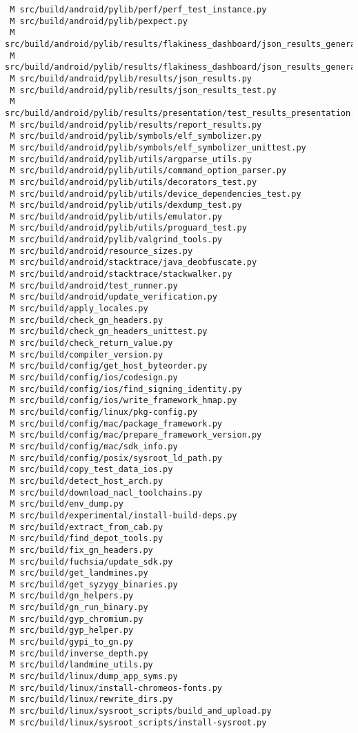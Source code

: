 \documentclass{article}
\begin{document}
\begin{verbatim}
 M src/build/android/pylib/perf/perf_test_instance.py
 M src/build/android/pylib/pexpect.py
 M src/build/android/pylib/results/flakiness_dashboard/json_results_generator.py
 M src/build/android/pylib/results/flakiness_dashboard/json_results_generator_unittest.py
 M src/build/android/pylib/results/json_results.py
 M src/build/android/pylib/results/json_results_test.py
 M src/build/android/pylib/results/presentation/test_results_presentation.py
 M src/build/android/pylib/results/report_results.py
 M src/build/android/pylib/symbols/elf_symbolizer.py
 M src/build/android/pylib/symbols/elf_symbolizer_unittest.py
 M src/build/android/pylib/utils/argparse_utils.py
 M src/build/android/pylib/utils/command_option_parser.py
 M src/build/android/pylib/utils/decorators_test.py
 M src/build/android/pylib/utils/device_dependencies_test.py
 M src/build/android/pylib/utils/dexdump_test.py
 M src/build/android/pylib/utils/emulator.py
 M src/build/android/pylib/utils/proguard_test.py
 M src/build/android/pylib/valgrind_tools.py
 M src/build/android/resource_sizes.py
 M src/build/android/stacktrace/java_deobfuscate.py
 M src/build/android/stacktrace/stackwalker.py
 M src/build/android/test_runner.py
 M src/build/android/update_verification.py
 M src/build/apply_locales.py
 M src/build/check_gn_headers.py
 M src/build/check_gn_headers_unittest.py
 M src/build/check_return_value.py
 M src/build/compiler_version.py
 M src/build/config/get_host_byteorder.py
 M src/build/config/ios/codesign.py
 M src/build/config/ios/find_signing_identity.py
 M src/build/config/ios/write_framework_hmap.py
 M src/build/config/linux/pkg-config.py
 M src/build/config/mac/package_framework.py
 M src/build/config/mac/prepare_framework_version.py
 M src/build/config/mac/sdk_info.py
 M src/build/config/posix/sysroot_ld_path.py
 M src/build/copy_test_data_ios.py
 M src/build/detect_host_arch.py
 M src/build/download_nacl_toolchains.py
 M src/build/env_dump.py
 M src/build/experimental/install-build-deps.py
 M src/build/extract_from_cab.py
 M src/build/find_depot_tools.py
 M src/build/fix_gn_headers.py
 M src/build/fuchsia/update_sdk.py
 M src/build/get_landmines.py
 M src/build/get_syzygy_binaries.py
 M src/build/gn_helpers.py
 M src/build/gn_run_binary.py
 M src/build/gyp_chromium.py
 M src/build/gyp_helper.py
 M src/build/gypi_to_gn.py
 M src/build/inverse_depth.py
 M src/build/landmine_utils.py
 M src/build/linux/dump_app_syms.py
 M src/build/linux/install-chromeos-fonts.py
 M src/build/linux/rewrite_dirs.py
 M src/build/linux/sysroot_scripts/build_and_upload.py
 M src/build/linux/sysroot_scripts/install-sysroot.py

\end{verbatim}
\end{document}
